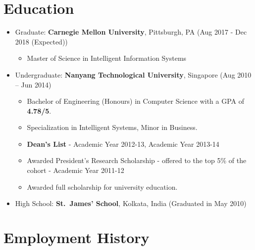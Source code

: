 
\section{Education}\label{education}

\begin{itemize}
\tightlist
\item
  Graduate: \textbf{Carnegie Mellon University}, Pittsburgh, PA
  \hfill (Aug 2017 - Dec 2018 (Expected))

  \begin{itemize}
  \tightlist
  \item
    Master of Science in Intelligent Information Systems
  \end{itemize}
\item
  Undergraduate: \textbf{Nanyang Technological University}, Singapore
  \hfill (Aug 2010 -- Jun 2014)

  \begin{itemize}
  \tightlist
  \item
    Bachelor of Engineering (Honours) in Computer Science with a GPA of
    \textbf{4.78/5}.
  \item
    Specialization in Intelligent Systems, Minor in Business.
  \item
    \textbf{Dean's List} - Academic Year 2012-13, Academic Year 2013-14
  \item
    Awarded President's Research Scholarship - offered to the top 5\% of
    the cohort - Academic Year 2011-12
  \item
    Awarded full scholarship for university education.
  \end{itemize}
\item
  High School: \textbf{St.~James' School}, Kolkata, India
  \hfill (Graduated in May 2010)
\end{itemize}

\section{Employment History}\label{employment-history}


